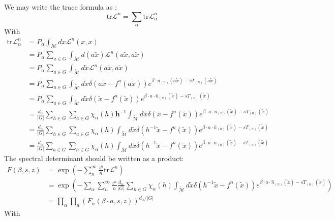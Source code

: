 \begin{description}
We may write the trace formula as :
\[
\mathrm{tr}\mathcal{L}^{n}=\sum_{\alpha}\mathrm{tr}\mathcal{L}_{\alpha}^{n}
\]
With 
\begin{align*}
\mathrm{tr}\mathcal{L}_{\alpha}^{n} & =P_{\alpha}\int_{\mathcal{M}}dx\mathcal{L}^{n}(x,x)\\
 & =P_{\alpha}\sum_{a\in G}\int_{\mathcal{\tilde{\mathcal{M}}}}d(a\tilde{x})\mathcal{L}^{n}(a\tilde{x},a\tilde{x})\\
 & =P_{\alpha}\sum_{a\in G}\int_{\mathcal{\tilde{\mathcal{M}}}}d\tilde{x}\mathcal{L}^{n}(a\tilde{x},a\tilde{x})\\
 & =P_{\alpha}\sum_{a\in G}\int_{\mathcal{\tilde{\mathcal{M}}}}d\tilde{x}\delta(a\tilde{x}-f^{n}(a\tilde{x}))e^{\beta\cdot\hat{n}_{(n)}(a\tilde{x})-sT_{(n)}(a\tilde{x})}\\
 & =P_{\alpha}\sum_{a\in G}\int_{\mathcal{\tilde{\mathcal{M}}}}d\tilde{x}\delta(\tilde{x}-f^{n}(\tilde{x}))e^{\beta\cdot a\cdot\hat{n}_{(n)}(\tilde{x})-sT_{(n)}(\tilde{x})}\\
 & =\frac{d_{\alpha}}{\vert G\vert}\sum_{h\in G}\sum_{a\in G}\chi_{\alpha}(h)\mathbf{h}^{-1}\int_{\mathcal{\tilde{\mathcal{M}}}}d\tilde{x}\delta(\tilde{x}-f^{n}(\tilde{x}))e^{\beta\cdot a\cdot\hat{n}_{(n)}(\tilde{x})-sT_{(n)}(\tilde{x})}\\
 & =\frac{d_{\alpha}}{\vert G\vert}\sum_{h\in G}\sum_{a\in G}\chi_{\alpha}(h)\int_{\mathcal{\tilde{\mathcal{M}}}}d\tilde{x}\delta(h^{-1}\tilde{x}-f^{n}(\tilde{x}))e^{\beta\cdot a\cdot\hat{n}_{(n)}(\tilde{x})-sT_{(n)}(\tilde{x})}\\
 & =\frac{d_{\alpha}}{\vert G\vert}\sum_{a\in G}\sum_{h\in G}\chi_{\alpha}(h)\int_{\mathcal{\tilde{\mathcal{M}}}}d\tilde{x}\delta(h^{-1}\tilde{x}-f^{n}(\tilde{x}))e^{\beta\cdot a\cdot\hat{n}_{(n)}(\tilde{x})-sT_{(n)}(\tilde{x})}
\end{align*}
The spectral determinant should be written as a product:
\begin{align*}
F(\beta,s,z) & =\exp\left(-\sum_{n}^{\infty}\frac{z^{n}}{n}\mathrm{tr}\mathcal{L}^{n}\right)\\
 & =\exp\left(-\sum_{\alpha}\sum_{n}^{\infty}\frac{z^{n}}{n}\frac{d_{\alpha}}{\vert G\vert}\sum_{h\in G}\chi_{\alpha}(h)\int_{\mathcal{\tilde{\mathcal{M}}}}d\tilde{x}\delta(h^{-1}\tilde{x}-f^{n}(\tilde{x}))e^{\beta\cdot a\cdot\hat{n}_{(n)}(\tilde{x})-sT_{(n)}(\tilde{x})}\right)\\
 & =\prod_{\alpha}\prod_{a}\left(F_{\alpha}(\beta\cdot a,s,z)\right)^{d_{\alpha}/\vert G\vert}
\end{align*}
With


\end{description}
